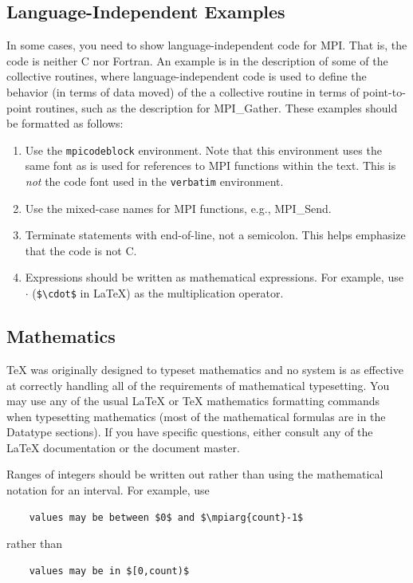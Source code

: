 \documentclass[letterpaper,twoside,11pt,fleqn]{article}
\def\MPI/{\textsf{MPI}}    %
\begin{document}
\subsection{Language-Independent Examples}
\label{sec:mpi-code}
In some cases, you need to show language-independent code for \MPI/.
That is, the code is neither C nor Fortran.  An example is in the
description of some of the collective routines, where
language-independent code is used to define the behavior (in terms of
data moved) of the a collective routine in terms of point-to-point
routines, such as the description for \textsf{MPI\_Gather}.
These examples should be formatted as follows:
\begin{enumerate}
\item Use the \texttt{mpicodeblock} environment.  Note that this
  environment uses the same font as is used for references to \MPI/
  functions within the text.  This is \emph{not} the code font used in
  the \texttt{verbatim} environment.
\item Use the mixed-case names for \MPI/ functions,
  e.g., \textsf{MPI\_Send}.
\item Terminate statements with end-of-line, not a semicolon. This
  helps emphasize that the code is not C.
\item Expressions should be written as mathematical expressions.  For
  example, use $\cdot$ (\verb+$\cdot$+ in LaTeX) as the multiplication
  operator.
\end{enumerate}

\subsection{Mathematics}
TeX was originally designed to typeset mathematics and no system is as
effective at correctly handling all of the requirements of
mathematical typesetting.  You may use any of the usual LaTeX or TeX
mathematics formatting commands when typesetting mathematics (most of
the mathematical formulas are in the Datatype sections).  If you have
specific questions, either consult any of the LaTeX documentation or
the document master.

Ranges of integers should be written out rather than using the
mathematical notation for an interval.  For example, use
\begin{verbatim}
    values may be between $0$ and $\mpiarg{count}-1$
\end{verbatim}
rather than
\begin{verbatim}
    values may be in $[0,count)$
\end{verbatim}
\end{document}
